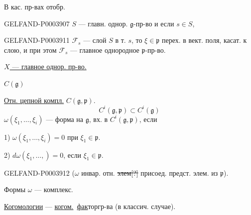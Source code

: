 В кас. пр-вах отобр. 

\begin{GelfandAdjacentEvidence}{GELFAND-P000390}{7}
$S$ --- главн. однор. $\mathfrak{g}$-пр-во и если $s\in S$,
\end{GelfandAdjacentEvidence}



\begin{GelfandAdjacentEvidence}{GELFAND-P000391}{1}
$\mathcal{F}_s$ --- слой $S$ в т. $s$, то $\xi\in\mathfrak{p}$ перех. в вект. поля,
касат. к слою, и при этом $\mathcal{F}_s$ --- главное однородное
$\mathfrak{p}$-пр-во.
\end{GelfandAdjacentEvidence}


\underline{$X$ --- главное однор. пр-во.}

 $C(\mathfrak{g})$

\underline{Отн. цепной компл.} $C(\mathfrak{g},\mathfrak{p})$.
\begin{equation*}
C^i(\mathfrak{g},\mathfrak{p})\subset C^i(\mathfrak{g})
\end{equation*}
$\omega(\xi_1,\dots,\xi_i)$ --- форма на $\mathfrak{g}$, вх. в
$C^i(\mathfrak{g},\mathfrak{p})$, если

1) $\omega(\xi_1,\dots,\xi_i)=0$ при $\xi_1\in\mathfrak{p}$.

2) $d\omega(\xi_1,\dots,)=0$, если $\xi_1\in\mathfrak{p}$.

\begin{GelfandAdjacentEvidence}{GELFAND-P000391}{2}
($\omega$ инвар. отн. \sout{элем[?]} присоед. предст. элем. из $\mathfrak{p}$).
\end{GelfandAdjacentEvidence}


Формы $\omega$ --- комплекс.

\underline{Когомологии} --- \underline{когом.}\ \underline{фак}торгр-ва (в классич. случае).

